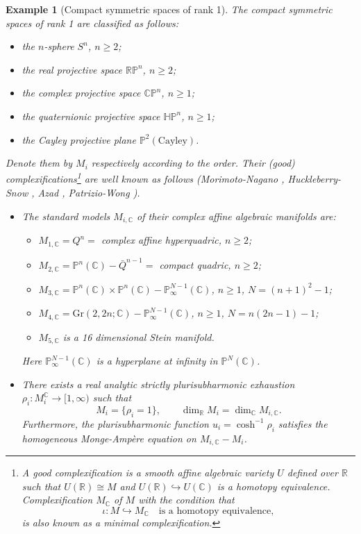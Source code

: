 \documentclass[11pt]{amsart}
\theoremstyle{plain}
\newtheorem{eg}[thm]{Example}
\theoremstyle{definition}
\newcommand{\R}{\mathbb{R}}
\newcommand{\C}{\mathbb{C}}
\begin{document}

\begin{eg}[Compact symmetric spaces of rank 1]
The compact symmetric spaces of rank 1 are classified as follows:
\begin{itemize}
    \item[$(1)$] the $n$-sphere $S^n$, $n\geq2$;
    \item[$(2)$] the real projective space $\mathbb{RP}^n$, $n\geq2$;
    \item[$(3)$] the complex projective space $\mathbb{CP}^n$, $n\geq1$;
    \item[$(4)$] the quaternionic projective space $\mathbb{HP}^n$, $n\geq1$;
    \item[$(5)$] the Cayley projective plane $\mathbb{P}^2(\mathrm{Cayley})$.
\end{itemize}
Denote them by $M_i$ respectively according to the order. Their (good) complexifications\footnote{A good complexification is a smooth affine algebraic variety $U$ defined over $\R$ such that $U(\R)\cong M$ and $U(\R)\hookrightarrow U(\C)$ is a homotopy equivalence. Complexification $M_{\C}$ of $M$ with the condition that
\[\iota:M\hookrightarrow M_{\C} \quad\text{is a homotopy equivalence},\]
is also known as a minimal complexification.} are well known as follows (Morimoto-Nagano \cite{MN}, Huckleberry-Snow \cite{HS}, Azad \cite{Az}, Patrizio-Wong \cite{PW}).
\begin{itemize}
    \item[(I)] The standard models $M_{i,\C}$ of their complex affine algebraic manifolds are: 
\begin{itemize}
    \item[$(1)$] $M_{1,\C}=Q^n=$ complex affine hyperquadric, $n\geq2$;
    \item[$(2)$] $M_{2,\C}=\mathbb{P}^n(\C)-\bar{Q}^{n-1}=$ compact quadric, $n\geq2$;
    \item[$(3)$] $M_{3,\C}=\mathbb{P}^n(\C)\times\mathbb{P}^n(\C)-\mathbb{P}_{\infty}^{N-1}(\C)$, $n\geq1$, $N=(n+1)^2-1$;
    \item[$(4)$] $M_{4,\C}=\mathrm{Gr}(2,2n;\C)-\mathbb{P}_{\infty}^{N-1}(\C)$, $n\geq1$, $N=n(2n-1)-1$;
    \item[$(5)$] $M_{5,\C}$ is a 16 dimensional Stein manifold.
\end{itemize}
Here $\mathbb{P}_{\infty}^{N-1}(\C)$ is a hyperplane at infinity in $\mathbb{P}^N(\C)$.
   \item[(II)] There exists a real analytic strictly plurisubharmonic exhaustion $\rho_i:M_i^{\C}\rightarrow[1,\infty)$ such that 
\[M_i=\{\rho_i=1\},\qquad\dim_{\R}M_i=\dim_{\C}M_{i,\C}.\] Furthermore, the plurisubharmonic function $u_i=\cosh^{-1}\rho_i$ satisfies the homogeneous Monge-Amp\`ere equation on $M_{i,\C}-M_i$.  
\end{itemize}


\end{eg}
\end{document}
